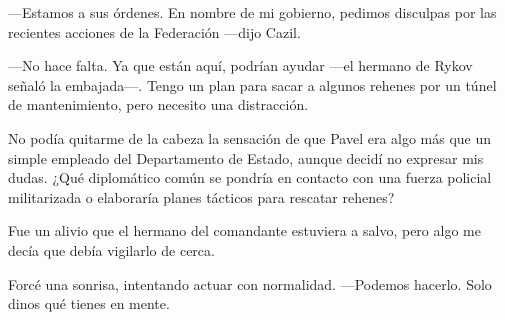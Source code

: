 —Estamos a sus órdenes. En nombre de mi gobierno, pedimos disculpas por las recientes acciones de la Federación —dijo Cazil.

—No hace falta. Ya que están aquí, podrían ayudar —el hermano de Rykov señaló la embajada—. Tengo un plan para sacar a algunos rehenes por un túnel de mantenimiento, pero necesito una distracción.

No podía quitarme de la cabeza la sensación de que Pavel era algo más que un simple empleado del Departamento de Estado, aunque decidí no expresar mis dudas. ¿Qué diplomático común se pondría en contacto con una fuerza policial militarizada o elaboraría planes tácticos para rescatar rehenes?

Fue un alivio que el hermano del comandante estuviera a salvo, pero algo me decía que debía vigilarlo de cerca.

Forcé una sonrisa, intentando actuar con normalidad. —Podemos hacerlo. Solo dinos qué tienes en mente.
